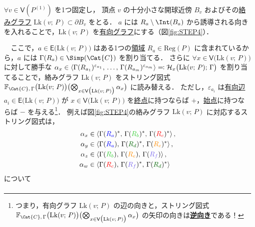 \documentclass[TQFT_main]{subfiles}
\begin{document}
\begin{description}
    $\forall v \in \mathsf{V}(P^{(1)})$ を1つ固定し，
    頂点 $v$ の十分小さな開球近傍 $B_v$ およびその\hyperref[def:linkedG]{絡みグラフ} $\mathrm{Lk}(v;\, P) \subset \partial B_v$ をとる．
    $a$ には $R_a \setminus \Int(B_a)$ から誘導される向きを入れることで，$\mathrm{Lk}(v;\, P)$ を\underline{有向グラフ}にする（図\ref{fig:STEP4}）．
    
    　ここで，$a \in \mathsf{E}\bigl(\mathrm{Lk}(v;\, P)\bigr)$ はある1つの\hyperref[def:polyhedron]{領域} $R_a \in \mathrm{Reg}(P)$ に含まれているから，$a$ には $\Gamma(R_a) \in \Simp(\Cat{C})$ を割り当てる．
    さらに $\forall x \in \mathsf{V}\bigl(\mathrm{Lk}(v;\, P)\bigr)$ に対して勝手な $\alpha_x \in \expval{\Gamma(R_{a_1})^{\varepsilon_{a_1}},\, \dots,\, \Gamma(R_{a_m})^{\varepsilon_{a_m}}} \eqqcolon \mathcal{H}_x\bigl(\mathrm{Lk}(v;\, P);\, \Gamma\bigr)$ を割り当てることで，絡みグラフ $\mathrm{Lk}(v;\, P)$ をストリング図式 $\mathbb{F}_{\Cat{C},\, \Gamma} \bigl( \mathrm{Lk}(v;\, P) \bigr)\bigl( \bigotimes_{x \in \mathsf{V} \bigl( \mathrm{Lk}(v;\, P) \bigr) } \alpha_x \bigr)$ に読み替える．
    ただし，$\varepsilon_{a_i}$ は\underline{有向辺} $a_i \in \mathsf{E} \bigl( \mathrm{Lk}(v;\, P) \bigr)$ が $x \in \mathsf{V}\bigl(\mathrm{Lk}(v;\, P)\bigr)$ を\underline{終点}に持つならば $+$，\underline{始点}に持つならば $-$ を与える\footnote{つまり，有向グラフ $\mathrm{Lk}(v;\, P)$ の辺の向きと，ストリング図式 $\mathbb{F}_{\Cat{C},\, \Gamma} \bigl( \mathrm{Lk}(v;\, P) \bigr)\bigl( \bigotimes_{x \in \mathsf{V} \bigl( \mathrm{Lk}(v;\, P) \bigr) } \alpha_x \bigr)$ の矢印の向きは\underline{\textbf{逆向き}}である！}．
    例えば図\ref{fig:STEP4}の絡みグラフ $\mathrm{Lk}(v;\, P)$ に対応するストリング図式は，
    \begin{align}
        \alpha_x &\in \expval{\Gamma(\textcolor{blue}{R_a})^*,\, \Gamma(\textcolor{LimeGreen}{R_b})^*,\, \Gamma(\textcolor{red}{R_c})^*}, \\
        \alpha_y &\in \expval{\Gamma(\textcolor{blue}{R_a}),\, \Gamma(\textcolor{DarkGreen}{R_d})^*,\, \Gamma(\textcolor{DarkOrange}{R_e})^*}, \\
        \alpha_z &\in \expval{\Gamma(\textcolor{LimeGreen}{R_b}),\, \Gamma(\textcolor{DarkOrange}{R_e}),\,\Gamma(\textcolor{MediumSlateBlue}{R_f})}, \\
        \alpha_w &\in \expval{\Gamma(\textcolor{red}{R_c}),\, \Gamma(\textcolor{MediumSlateBlue}{R_f})^*,\, \Gamma(\textcolor{DarkGreen}{R_d})^*}
    \end{align}
    について
    \begin{align}

\end{align}
\end{description}
\end{document}
